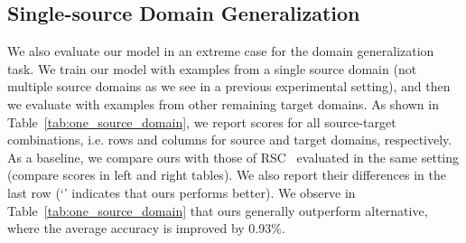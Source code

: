 \documentclass[10pt,twocolumn,letterpaper]{article}
\begin{document}
\subsection{Single-source Domain Generalization}\label{sec:one_source}
We also evaluate our model in an extreme case for the domain generalization task. We train our model with examples from a single source domain (not multiple source domains as we see in a previous experimental setting), and then we evaluate with examples from other remaining target domains. As shown in Table~\ref{tab:one_source_domain}, we report scores for all source-target combinations, i.e. rows and columns for source and target domains, respectively. As a baseline, we compare ours with those of RSC~\cite{huangRSC2020} evaluated in the same setting (compare scores in left and right tables). We also report their differences in the last row (`' indicates that ours performs better). We observe in Table~\ref{tab:one_source_domain} that ours generally outperform alternative, where the average accuracy is improved by 0.93\%.
\end{document}
